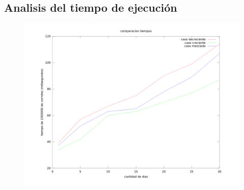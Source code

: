 \subsection{Analisis del tiempo de ejecución}

\begin{figure}[h]
\centering                                                       
        \includegraphics[width=340pt]{./figs/p1Tiempos.png}
\end{figure}





